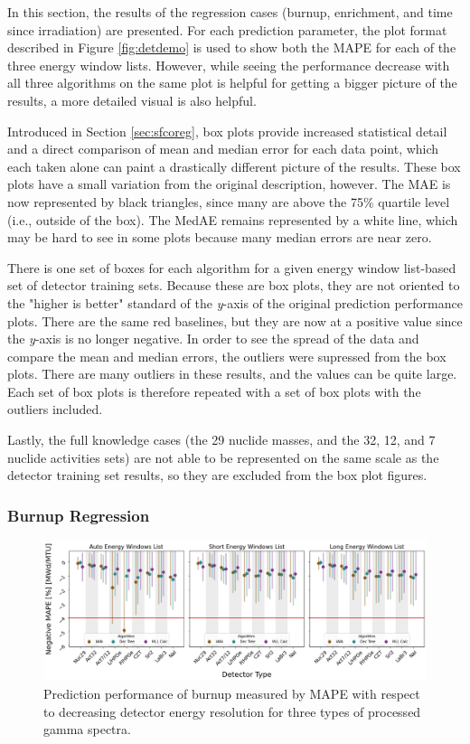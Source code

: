 
In this section, the results of the regression cases (burnup, enrichment, and
time since irradiation) are presented. For each prediction parameter, the plot
format described in Figure \ref{fig:detdemo} is used to show both the
\gls{MAPE} for each of the three energy window lists.  However, while seeing
the performance decrease with all three algorithms on the same plot is helpful
for getting a bigger picture of the results, a more detailed visual is also
helpful. 

Introduced in Section \ref{sec:sfcoreg}, box plots provide increased
statistical detail and a direct comparison of mean and median error for each
data point, which each taken alone can paint a drastically different picture of
the results. These box plots have a small variation from the original
description, however.  The \gls{MAE} is now represented by black triangles,
since many are above the 75\% quartile level (i.e., outside of the box).  The
\gls{MedAE} remains represented by a white line, which may be hard to see in
some plots because many median errors are near zero.

There is one set of boxes for each algorithm for a given energy window
list-based set of detector training sets.  Because these are box plots, they
are not oriented to the "higher is better" standard of the \textit{y}-axis of
the original prediction performance plots.  There are the same red baselines,
but they are now at a positive value since the \textit{y}-axis is no longer
negative. In order to see the spread of the data and compare the mean and
median errors, the outliers were supressed from the box plots. There are many
outliers in these results, and the values can be quite large. Each set of box
plots is therefore repeated with a set of box plots with the outliers included.

Lastly, the full knowledge cases (the 29 nuclide masses, and the 32, 12, and 7
nuclide activities sets) are not able to be represented on the same scale as
the detector training set results, so they are excluded from the box plot
figures. 

\subsubsection{Burnup Regression}

\begin{figure}[!htb]
  \centering
  \includegraphics[width=\textwidth]{./chapters/exp2/detector_preds_wrt_enlist_MAPE_burn.png}
  \caption{Prediction performance of burnup measured by \gls{MAPE} with 
           respect to decreasing detector energy resolution for three types 
           of processed gamma spectra.}
  \label{fig:burn}
\end{figure}

